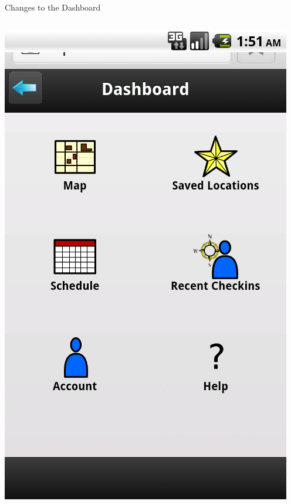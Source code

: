 \documentclass{beamer}
\begin{document}
\begin{frame}{Changes to the Dashboard}
    \begin{columns}[c]
        \center\includegraphics[height=0.5 \textheight]{pre-heuristic/dashboard.png}

\end{columns}
\end{frame}
\end{document}

